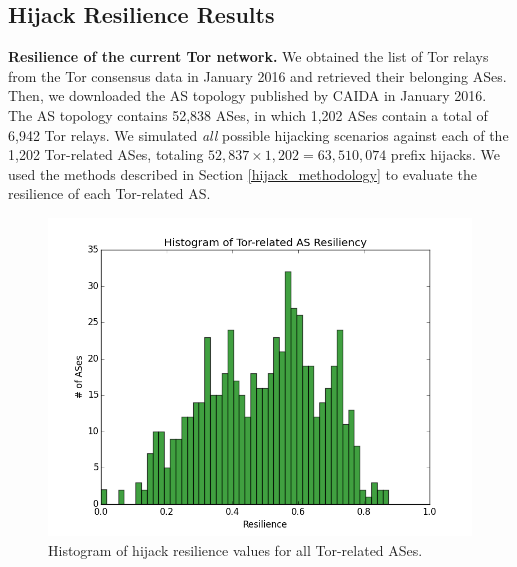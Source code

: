 
\subsection{Hijack Resilience Results}

{\bf Resilience of the current Tor network.} We obtained the list of Tor relays from the Tor consensus data in January 2016 and retrieved their belonging ASes. Then, we downloaded the AS topology published by CAIDA in January 2016. The AS topology contains 52,838 ASes, in which 1,202 ASes contain a total of 6,942 Tor relays. We simulated \emph{all} possible hijacking scenarios against each of the 1,202 Tor-related ASes, totaling $52,837 \times 1,202 = 63,510,074$ prefix hijacks. We used the methods described in Section \ref{hijack_methodology} to evaluate the resilience of each Tor-related AS. 

\begin{figure}[ht!]
\centering
\includegraphics[width=.4\textwidth]{figure/resilience_histogram}
\caption{Histogram of hijack resilience values for all Tor-related ASes.}
\label{fig:hijack_resilience_histogram}
\end{figure}

